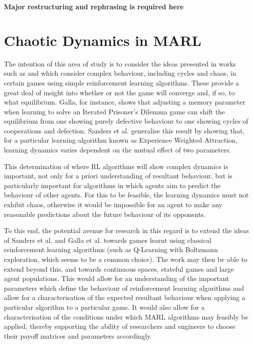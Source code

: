 \documentclass[.../main.tex]{subfiles}
\begin{document}
	\textbf{Major restructuring and rephrasing is required here}

    \section{Chaotic Dynamics in MARL} \label{sec::Chaos_in_MARL}
    The intention of this area of study is to consider the ideas presented in works such as 
    \cite{Sanders2018} and \cite{Galla2011} which consider complex behaviour, including cycles and
    chaos, in certain games using simple reinforcement learning algorithms. These provide a great
    deal of insight into whether or not the game will converge and, if so, to what equilibrium.
    Galla, for instance, shows that adjusting a memory parameter when learning to solve an Iterated
    Prisoner's Dilemma game can shift the equilibrium from one showing purely defective behaviour to
    one showing cycles of cooperations and defection. Sanders et al. generalise this result by
    showing that, for a particular learning algorithm known as Experience Weighted Attraction,
    learning dynamics varies dependent on the mutual effect of two parameters. 

    This determination of where RL algorithms will show complex dynamics is important, not only for
    a priori understanding of resultant behaviour, but is particularly important for algorithms in
    which agents aim to predict the behaviour of other agents. For this to be feasible, the learning
    dynamics must not exhibit chaos, otherwise it would be impossible for an agent to make any
    reasonable predictions about the future behaviour of its opponents. 

    To this end, the potential avenue for research in this regard is to extend the ideas of Sanders
    et al. and Galla et al. towards games learnt using classical reinforcement learning algorithms 
    (such as Q-Learning with Boltzmann exploration, which seems to be a common choice). The work may
    then be able to extend beyond this, and towards continuous spaces, stateful games and large
    agent populations. This would allow for an understanding of the important parameters which
    define the behaviour of reinforcement learning algorithms and allow for a characterisation of
    the expected resultant behaviour when applying a particular algorithm to a particular game. It
    would also allow for a characterisation of the conditions under which MARL algorithms may
    feasibly be applied, thereby supporting the ability of researchers and engineers to choose their
    payoff matrices and parameters accordingly.
\end{document}
